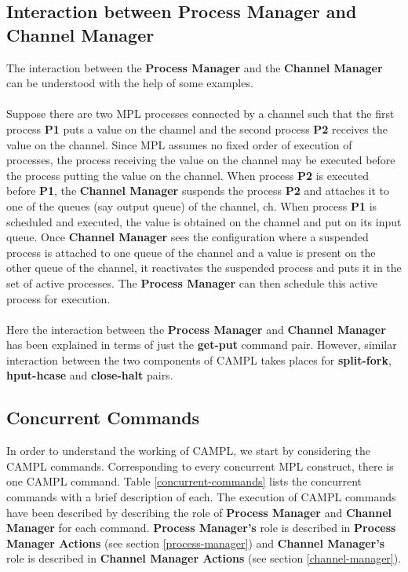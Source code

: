 \documentclass[11pt]{article}
\newcommand{\<}{\langle}
\renewcommand{\>}{\rangle}
\begin{document}
\subsection {Interaction between Process Manager and Channel Manager}
The interaction between the {\bf Process Manager} and the {\bf Channel Manager} can be understood with the help of some examples.
~~\\~~\\
Suppose there are two MPL processes connected by a channel such that the first process {\bf P1} puts a value on the channel and the second process {\bf P2} receives the value on the channel. Since MPL assumes no fixed order of execution of processes, the process receiving the value on the channel may be executed before the process putting the value on the channel. When process {\bf P2} is executed before {\bf P1}, the {\bf Channel Manager} suspends the process {\bf P2} and attaches it to one of the queues (say output queue) of the channel, ch. When process {\bf P1} is scheduled and executed, the value is obtained on the channel and put on its input queue. Once {\bf Channel Manager} sees the configuration where a suspended process is attached to one queue of the channel and a value is present on the other queue of the channel, it reactivates the suspended process and puts it in the set of active processes. The {\bf Process Manager} can then schedule this active process for execution.
~~\\~~\\ 
Here the interaction between the {\bf Process Manager} and {\bf Channel Manager} has been explained in terms of just the {\bf get-put} command pair. However, similar interaction between the two components of CAMPL takes places for {\bf split-fork}, {\bf hput-hcase} and {\bf close-halt} pairs.
\subsection {Concurrent Commands}
In order to understand the working of CAMPL, we start by considering the CAMPL commands. Corresponding to every concurrent MPL construct, there is one CAMPL command. Table \ref {concurrent-commands} lists the concurrent commands with a brief description of each. The execution of CAMPL commands have been described by describing the role of {\bf Process Manager} and {\bf Channel Manager} for each command. {\bf Process Manager's} role is described in  {\bf Process Manager Actions} (see section \ref {process-manager}) and {\bf Channel Manager's} role is described in {\bf Channel Manager Actions} (see section  \ref {channel-manager}).   
\end{document}
